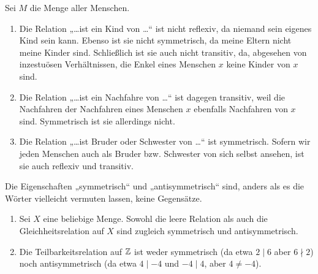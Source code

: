 \begin{bsp}[Verwandtschaftsgrade]
    Sei $M$ die Menge aller Menschen.
    \begin{enumerate}
        \item Die Relation „\dots ist ein Kind von \dots“ ist nicht reflexiv, da niemand sein eigenes Kind sein kann. Ebenso ist sie nicht symmetrisch, da meine Eltern nicht meine Kinder sind. Schließlich ist sie auch nicht transitiv, da, abgesehen von inzestuösen Verhältnissen, die Enkel eines Menschen $x$ keine Kinder von $x$ sind.
        \item Die Relation „\dots ist ein Nachfahre von \dots“ ist dagegen transitiv, weil die Nachfahren der Nachfahren eines Menschen $x$ ebenfalls Nachfahren von $x$ sind. Symmetrisch ist sie allerdings nicht.
        \item Die Relation „\dots ist Bruder oder Schwester von \dots“ ist symmetrisch. Sofern wir jeden Menschen auch als Bruder bzw. Schwester von sich selbst ansehen, ist sie auch reflexiv und transitiv.
    \end{enumerate}
\end{bsp}


\begin{bsp}
    Die Eigenschaften „symmetrisch“ und „antisymmetrisch“ sind, anders als es die Wörter vielleicht vermuten lassen, keine Gegensätze.
    \begin{enumerate}
        \item Sei $X$ eine beliebige Menge. Sowohl die leere Relation als auch die Gleichheitsrelation auf $X$ sind zugleich symmetrisch und antisymmetrisch.
        \item Die Teilbarkeitsrelation auf $\mathbb Z$ ist weder symmetrisch (da etwa $2\mid 6$ aber $6\nmid 2$) noch antisymmetrisch (da etwa $4\mid -4$ und $-4\mid 4$, aber $4\neq -4$).
    \end{enumerate}
\end{bsp}


